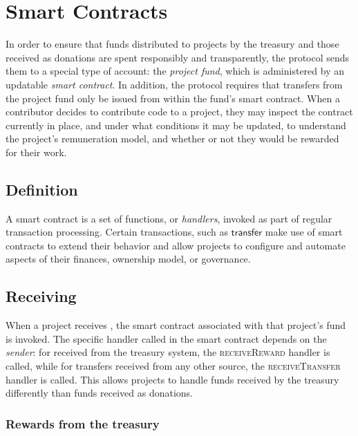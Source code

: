 \section{Smart Contracts}
\label{s:smart-contracts}

\newcommand{\handler}[1]{\textsc{\small#1}}

In order to ensure that funds distributed to projects by the \oscoin{} treasury
and those received as donations are spent responsibly and transparently, the
\oscoin{} protocol sends them to a special type of account: the \emph{project
fund}, which is administered by an updatable \emph{smart contract}.
In addition, the protocol requires that transfers from the project fund only be
issued from within the fund's smart contract. When a contributor decides to
contribute code to a project, they may inspect the contract currently in place,
and under what conditions it may be updated, to understand the project's
remuneration model, and whether or not they would be rewarded for their work.

\subsection{Definition}
A smart contract is a set of functions, or \emph{handlers}, invoked as part
of regular transaction processing. Certain transactions, such as $\mathsf{transfer}$
make use of smart contracts to extend their behavior and allow projects to
configure and automate aspects of their finances, ownership model, or governance.

\subsection{Receiving \oscoin{}}

When a project receives \oscoin{}, the smart contract associated with that
project's fund is invoked. The specific handler called in the smart contract
depends on the \emph{sender}: for \oscoin{} received from the treasury system,
the \handler{receiveReward} handler is called, while for transfers received
from any other source, the \handler{receiveTransfer} handler is called. This
allows projects to handle funds received by the treasury differently
than funds received as donations.

\subsubsection{Rewards from the treasury}


